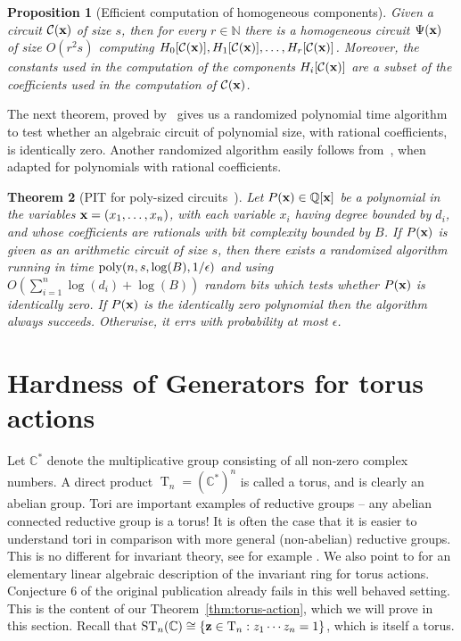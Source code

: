 \documentclass[10pt,a4paper]{article}
\newtheorem{theorem}{Theorem}
\newtheorem{proposition}[theorem]{Proposition}
\newcommand{\C}{\mathbb C}
\newcommand{\Q}{\mathbb Q}
\newcommand{\N}{\mathbb N}
\newcommand{\T}{\operatorname T}
\newcommand{\ST}{\operatorname{ST}}
\newcommand{\cC}{\mathcal C}
\newcommand{\bx}{\textbf x}
\newcommand{\bz}{\textbf z}
\begin{document}
\begin{proposition}[Efficient computation of homogeneous components]\label{prop:hom-components}
	Given a circuit $\cC(\bx)$ of size $s$, then for every $r \in \N$
	there is a homogeneous circuit $\Psi(\bx)$ of size $O(r^2 s)$
	computing $H_0[\cC(\bx)], H_1[\cC(\bx)], \ldots, H_r[\cC(\bx)]$.
	Moreover, the constants used in the computation of the components $H_i[\cC(\bx)]$
	are a subset of the coefficients used in the computation of $\cC(\bx)$.
%
%
\end{proposition}

The next theorem, proved by~\cite[Theorem 4.10]{AB03} gives us a randomized polynomial time
algorithm to test whether an algebraic circuit of polynomial size, with rational
coefficients, is identically zero. Another randomized algorithm easily follows
from~\cite[Lemma 2]{S79}, when adapted for polynomials with rational coefficients.

\begin{theorem}[PIT for poly-sized circuits~\cite{AB03}]\label{thm:PIT-BPP}
	Let $P(\bx) \in \Q[\bx]$ be a polynomial in the variables $\bx = (x_1, \ldots, x_n)$, with
	each variable $x_i$ having degree bounded by $d_i$, and whose coefficients are rationals with
	bit complexity bounded by $B$. If $P(\bx)$ is given as an arithmetic circuit of size $s$, then
	there exists a randomized algorithm running in time ${\rm poly}(n, s, \log(B), 1/\epsilon)$
	and using $O\left(\sum_{i=1}^n \log(d_i) + \log(B) \right)$ random bits which tests whether $P(\bx)$ is identically zero.
	If $P(\bx)$ is the identically zero polynomial then the algorithm always succeeds.
	Otherwise, it errs with probability at most $\epsilon$.
\end{theorem}

\setcounter{theorem}{19}
\section{Hardness of Generators for torus actions}\label{sec:torus}

Let $\C^*$ denote the multiplicative group consisting of all non-zero
complex numbers. A direct product $\T_n = (\C^*)^n$ is called a torus, and
is clearly an abelian group. Tori are important examples of reductive
groups -- any abelian connected reductive group is a torus! It is often the case that it is easier to understand tori in comparison with more general (non-abelian) reductive groups. This is no different for invariant theory, see for example \cite{DK,Wehlau}. We also point to \cite[Proposition~3.3]{DM-exp} for an elementary linear algebraic description of the invariant ring for torus actions. Conjecture 6 of the original publication already fails in this well behaved setting.
This is the content of our Theorem~\ref{thm:torus-action}, which we will prove in this section.
Recall that $\ST_n(\C) \cong \{ \bz \in \T_n : z_1\cdots z_n = 1 \}$, which is itself a torus.
\end{document}

